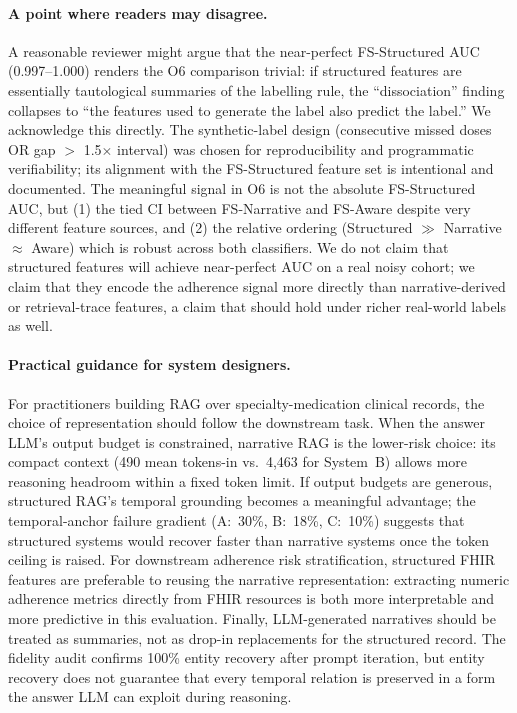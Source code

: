\paragraph{A point where readers may disagree.}
A reasonable reviewer might argue that the near-perfect FS-Structured AUC (0.997--1.000)
renders the O6 comparison trivial: if structured features are essentially tautological
summaries of the labelling rule, the ``dissociation'' finding collapses to ``the features
used to generate the label also predict the label.''  We acknowledge this directly.  The
synthetic-label design (consecutive missed doses OR gap $>$ 1.5$\times$ interval) was
chosen for reproducibility and programmatic verifiability; its alignment with the
FS-Structured feature set is intentional and documented.  The meaningful signal in O6 is
not the absolute FS-Structured AUC, but (1) the tied CI between FS-Narrative and FS-Aware
despite very different feature sources, and (2) the relative ordering (Structured $\gg$
Narrative $\approx$ Aware) which is robust across both classifiers.  We do not claim
that structured features will achieve near-perfect AUC on a real noisy cohort; we claim
that they encode the adherence signal more directly than narrative-derived or
retrieval-trace features, a claim that should hold under richer real-world labels as well.

\paragraph{Practical guidance for system designers.}
For practitioners building RAG over specialty-medication clinical records, the choice of
representation should follow the downstream task.  When the answer LLM's output budget
is constrained, narrative RAG is the lower-risk choice: its compact context (490 mean
tokens-in vs.\ 4,463 for System~B) allows more reasoning headroom within a fixed token
limit.  If output budgets are generous, structured RAG's temporal grounding becomes a
meaningful advantage; the temporal-anchor failure gradient (A:~30\%, B:~18\%, C:~10\%)
suggests that structured systems would recover faster than narrative systems once the
token ceiling is raised.  For downstream adherence risk stratification, structured FHIR
features are preferable to reusing the narrative representation: extracting numeric
adherence metrics directly from FHIR resources is both more interpretable and more
predictive in this evaluation.  Finally, LLM-generated narratives should be treated as
summaries, not as drop-in replacements for the structured record.  The fidelity audit
confirms 100\% entity recovery after prompt iteration, but entity recovery does not
guarantee that every temporal relation is preserved in a form the answer LLM can
exploit during reasoning.
